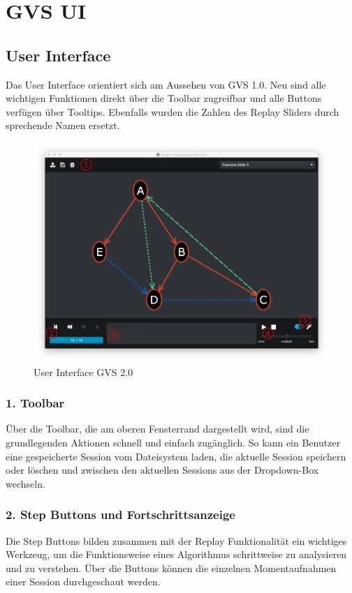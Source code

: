 \documentclass[11pt,a4paper,english,oneside]{book}
\numberwithin{equation}{chapter}
\begin{document}
	
	\section{GVS UI}
	\subsection{User Interface}
	Das User Interface orientiert sich am Aussehen von GVS 1.0. Neu sind alle wichtigen Funktionen direkt über die Toolbar zugreifbar und alle Buttons verfügen über Tooltips. Ebenfalls wurden die Zahlen des Replay Sliders durch sprechende Namen ersetzt.
	
	\begin{figure}[h!]
		\centering
		\includegraphics[width=0.7\linewidth]{assets/images/gvs-ui-graph}
		\caption{User Interface GVS 2.0}
		\label{fig:gvs-ui-graph}
	\end{figure}
	
	\subsubsection{1. Toolbar}
	Über die Toolbar, die am oberen Fensterrand dargestellt wird, sind die grundlegenden Aktionen schnell und einfach zugänglich. So kann ein Benutzer eine gespeicherte Session vom Dateisystem laden, die aktuelle Session speichern oder löschen und zwischen den aktuellen Sessions aus der Dropdown-Box wechseln. 
	
	\subsubsection{2. Step Buttons und Fortschrittsanzeige}
	Die Step Buttons bilden zusammen mit der Replay Funktionalität ein wichtiges Werkzeug, um die Funktionsweise eines Algorithmus schrittweise zu analysieren und zu verstehen. Über die Buttons können die einzelnen Momentaufnahmen einer Session durchgeschaut werden.
	
\end{document}
